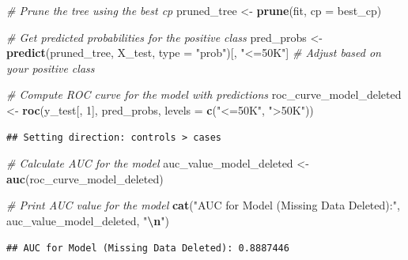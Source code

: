 \documentclass[
]{article}
\newenvironment{Shaded}{\begin{snugshade}}{\end{snugshade}}
\newcommand{\AttributeTok}[1]{\textcolor[rgb]{0.13,0.29,0.53}{#1}}
\newcommand{\CommentTok}[1]{\textcolor[rgb]{0.56,0.35,0.01}{\textit{#1}}}
\newcommand{\DecValTok}[1]{\textcolor[rgb]{0.00,0.00,0.81}{#1}}
\newcommand{\FunctionTok}[1]{\textcolor[rgb]{0.13,0.29,0.53}{\textbf{#1}}}
\newcommand{\NormalTok}[1]{#1}
\newcommand{\OtherTok}[1]{\textcolor[rgb]{0.56,0.35,0.01}{#1}}
\newcommand{\SpecialCharTok}[1]{\textcolor[rgb]{0.81,0.36,0.00}{\textbf{#1}}}
\newcommand{\StringTok}[1]{\textcolor[rgb]{0.31,0.60,0.02}{#1}}
\begin{document}
\begin{Shaded}
\begin{Highlighting}[]
\CommentTok{\# Prune the tree using the best cp}
\NormalTok{pruned\_tree }\OtherTok{\textless{}{-}} \FunctionTok{prune}\NormalTok{(fit, }\AttributeTok{cp =}\NormalTok{ best\_cp)}

\CommentTok{\# Get predicted probabilities for the positive class}
\NormalTok{pred\_probs }\OtherTok{\textless{}{-}} \FunctionTok{predict}\NormalTok{(pruned\_tree, X\_test, }\AttributeTok{type =} \StringTok{"prob"}\NormalTok{)[, }\StringTok{"\textless{}=50K"}\NormalTok{]  }\CommentTok{\# Adjust based on your positive class}

\CommentTok{\# Compute ROC curve for the model with predictions}
\NormalTok{roc\_curve\_model\_deleted }\OtherTok{\textless{}{-}} \FunctionTok{roc}\NormalTok{(y\_test[, }\DecValTok{1}\NormalTok{], pred\_probs, }\AttributeTok{levels =} \FunctionTok{c}\NormalTok{(}\StringTok{"\textless{}=50K"}\NormalTok{, }\StringTok{"\textgreater{}50K"}\NormalTok{))}
\end{Highlighting}
\end{Shaded}

\begin{verbatim}
## Setting direction: controls > cases
\end{verbatim}

\begin{Shaded}
\begin{Highlighting}[]
\CommentTok{\# Calculate AUC for the model}
\NormalTok{auc\_value\_model\_deleted }\OtherTok{\textless{}{-}} \FunctionTok{auc}\NormalTok{(roc\_curve\_model\_deleted)}

\CommentTok{\# Print AUC value for the model}
\FunctionTok{cat}\NormalTok{(}\StringTok{"AUC for Model (Missing Data Deleted):"}\NormalTok{, auc\_value\_model\_deleted, }\StringTok{"}\SpecialCharTok{\textbackslash{}n}\StringTok{"}\NormalTok{)}
\end{Highlighting}
\end{Shaded}

\begin{verbatim}
## AUC for Model (Missing Data Deleted): 0.8887446
\end{verbatim}

\begin{Shaded}
\end{Shaded}
\end{document}
